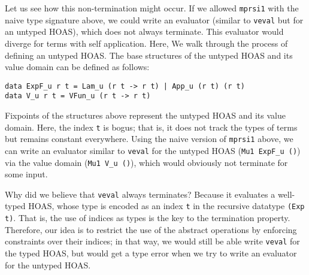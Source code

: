 Let us see how this non-termination might occur. If we allowed
\lstinline{mprsi1} with the naive type signature above, we could write
an evaluator (similar to \lstinline{veval} but for an untyped HOAS),
which does not always terminate. This evaluator would diverge for terms
with self application.
Here, We walk through the process of defining an untyped HOAS.
The base structures of the untyped HOAS and its value domain
can be defined as follows:
\begin{lstlisting}
data ExpF_u r t = Lam_u (r t -> r t) | App_u (r t) (r t)
data V_u r t = VFun_u (r t -> r t)
\end{lstlisting}
Fixpoints of the structures above represent the untyped HOAS and
its value domain. Here, the index \lstinline{t} is bogus; that is,
it does not track the types of terms but remains constant everywhere.
Using the naive version of \lstinline{mprsi1} above, we can write an evaluator
similar to \lstinline{veval} for the untyped HOAS (\lstinline{Mu1 ExpF_u ()})
via the value domain (\lstinline{Mu1 V_u ()}), which would obviously
not terminate for some input.

Why did we believe that \lstinline{veval} always terminates?
Because it evaluates a well-typed HOAS, whose type is encoded as
an index \lstinline{t} in the recursive datatype \lstinline{(Exp t)}. That is,
the use of indices as types is the key to the termination property.
Therefore, our idea is to restrict the use of the abstract operations
by enforcing constraints over their indices; in that way, 
we would still be able write \lstinline{veval} for the typed HOAS,
but would get a type error when we try to write an evaluator for
the untyped HOAS.



